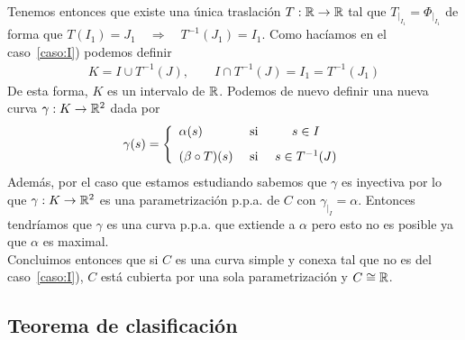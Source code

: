 \begin{observacion}
\begin{enumerate}
\begin{enumerate}
\begin{figure}[H]
%
            \end{figure}
            
            Tenemos entonces que existe una única traslación $T:\mathbb{R} \to \mathbb{R}$ tal que $T_{|_{I_1}} = \Phi_{|_{I_1}}$ de forma que $T(I_1)=J_1 \quad \Rightarrow \quad T^ {-1}(J_1) = I_1$. Como hacíamos en el caso~\ref{caso:I}) podemos definir
            \begin{gather*}
                K = I \cup T^{-1}(J), \qquad I\cap T^{-1}(J) = I_1 = T^{-1}(J_1)
            \end{gather*}
            De esta forma, $K$ es un intervalo de $\mathbb{R}$. Podemos de nuevo definir una nueva curva $\gamma : K \to \mathbb{R}^2$ dada por
            \begin{gather*}
                \gamma(s) =
                \left\{
                    \begin{array}{l c c}
                        \alpha(s) & \text{ si } & s \in I\\[0.8em]
                        (\beta \circ T)(s) & \text{ si } & s\in T^{-1}(J)
                    \end{array}
                \right.
            \end{gather*}
            Además, por el caso que estamos estudiando sabemos que $\gamma$ es inyectiva por lo que $\gamma : K \to \mathbb{R}^2$ es una parametrización p.p.a. de $C$ con $\gamma_{|_I} = \alpha$. Entonces tendríamos que $\gamma$ es una curva p.p.a. que extiende a $\alpha$ pero esto no es posible ya que $\alpha$ es maximal.\\

            Concluimos entonces que si $C$ es una curva simple y conexa tal que no es del caso~\ref{caso:I}), $C$ está cubierta por una sola parametrización y $C \cong \mathbb{R}$.
        \end{enumerate}
    \end{enumerate}
\end{observacion}

\subsection{Teorema de clasificación}

